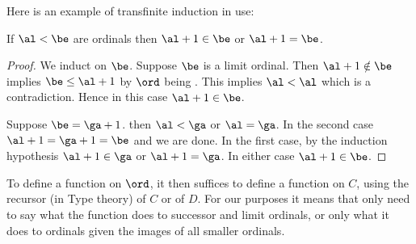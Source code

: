 Here is an example of transfinite induction in use:
\begin{lem}
    If $\al < \be$ are ordinals then $\al + 1 \in \be$ or $\al + 1 = \be$.
\end{lem}
\begin{proof}
    We induct on $\be$.
    Suppose $\be$ is a limit ordinal.
    Then $\al + 1 \notin \be$ implies $\be \leq \al + 1$ by $\ord$ being 
    .
    This implies $\al < \al$ which is a contradiction.
    Hence in this case $\al + 1 \in \be$.

    Suppose $\be = \ga + 1$.
    then $\al < \ga$ or $\al = \ga$.
    In the second case $\al + 1 = \ga + 1 = \be$ and we are done.
    In the first case, by the induction hypothesis $\al + 1 \in \ga$ or 
    $\al + 1 = \ga$. 
    In either case $\al + 1 \in \be$.
\end{proof}


To define a function on $\ord$, it then suffices to define a function on $C$, 
using the recursor (in Type theory) of $C$ or of $D$.
For our purposes it means that only need to say what the function does 
to successor and limit ordinals, 
or only what it does to ordinals given the images of all smaller ordinals.

